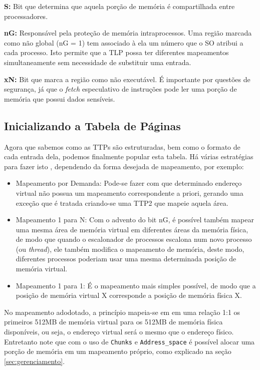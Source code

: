 \textbf{S:} Bit que determina que aquela porção de memória é compartilhada entre processadores.

\textbf{nG:} Responsável pela proteção de memória intraprocessos. Uma região marcada como não global (nG = 1) tem associado à ela um número que o SO atribui a cada processo. Isto permite que a TLP possa ter diferentes mapeamentos simultaneamente sem necessidade de substituir uma entrada.

\textbf{xN:} Bit que marca a região como não executável. É importante por questões de segurança, já que o \emph{fetch} especulativo de instruções pode ler uma porção de memória que possui dados sensíveis.


\subsection{Inicializando a Tabela de Páginas}
\label{init_pages}
Agora que sabemos como as TTPs são estruturadas, bem como o formato de cada entrada dela, podemos finalmente popular esta tabela. Há várias estratégias para fazer isto \cite{mmutheory}, dependendo da forma desejada de mapeamento, por exemplo:

\begin{itemize}
	\item Mapeamento por Demanda: Pode-se fazer com que determinado endereço virtual não possua um mapeamento correspondente a priori, gerando uma exceção que é tratada criando-se uma TTP2 que mapeie aquela área.
	\item Mapeamento 1 para N: Com o advento do bit nG, é possível também mapear uma mesma área de memória virtual em diferentes áreas da memória física, de modo que quando o escalonador de processos escalona num novo processo (ou \emph{thread}), ele também modifica o mapeamento de memória, deste modo, diferentes processos poderiam usar uma mesma determinada posição de memória virtual.
	\item Mapeamento 1 para 1: É o mapeamento mais simples possível, de modo que a posição de memória virtual X corresponde a posição de memória física X.
\end{itemize}


No mapeamento adodotado, a princípio mapeia-se em em uma relação 1:1 os primeiros 512MB de memória virtual para os 512MB de memória física disponíveis, ou seja, o endereço virtual será o mesmo que o endereço físico. Entretanto note que com o uso de \verb+Chunks+ e \verb+Address_space+ é possível alocar uma porção de memória em um mapeamento próprio, como explicado na seção \ref{sec:gerenciamento}.

